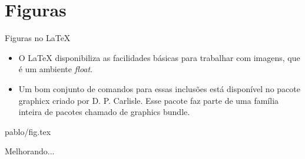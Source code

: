 \section{Figuras}

\begin{frame}{Figuras no \LaTeX{}}
\begin{block}{}
\begin{itemize}
 \item O \LaTeX{} disponibiliza as facilidades básicas para trabalhar com imagens, que é um ambiente \textit{float}.
\item Um bom conjunto de comandos para essas inclusões está disponível no pacote graphicx criado por D. P. Carlisle. Esse pacote faz parte de uma família inteira de pacotes chamado de graphics bundle.
\end{itemize}
\end{block}
\end{frame}

\begin{frame}


 {pablo/fig.tex}
\end{frame}

\begin{frame}{Melhorando...}

\end{frame}













